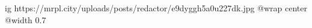  
 
 
 
 

\ifcmt
  ig https://mrpl.city/uploads/posts/redactor/e9dyggh5a0u227dk.jpg
  @wrap center
  @width 0.7
\fi
